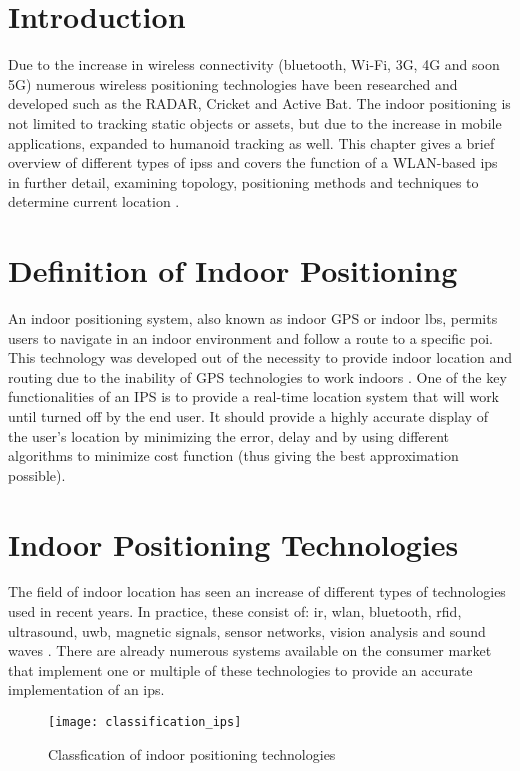 \section{Introduction}
Due to the increase in wireless connectivity (bluetooth, Wi-Fi, 3G, 4G and soon 5G) numerous wireless positioning technologies have been researched and developed such as the RADAR, Cricket and Active Bat. The indoor positioning is not limited to tracking static objects or assets, but due to the increase in mobile applications, expanded to humanoid tracking as well. This chapter gives a brief overview of different types of \acrfull{ips}s and covers the function of a WLAN-based \acrshort{ips} in further detail, examining topology, positioning methods and techniques to determine current location \cite{Sakpere2017}.
\section{Definition of Indoor Positioning}
An indoor positioning system, also known as indoor GPS or indoor \acrfull{lbs}, permits users to navigate in an indoor environment and follow a route to a specific \acrfull{poi}. This technology was developed out of the necessity to provide indoor location and routing due to the inability of GPS technologies to work indoors \cite{Indoors2019}. One of the key functionalities of an IPS is to provide a real-time location system that will work until turned off by the end user. It should provide a highly accurate display of the user's location by minimizing the error, delay and by using different algorithms to minimize cost function (thus giving the best approximation possible). 
\section{Indoor Positioning Technologies}
The field of indoor location has seen an increase of different types of technologies used in recent years. In practice, these consist of: \acrfull{ir}, \acrfull{wlan}, bluetooth, \acrfull{rfid}, ultrasound, \acrfull{uwb}, magnetic signals, sensor networks, vision analysis and sound waves \cite{Gu2009}. There are already numerous systems available on the consumer market that implement one or multiple of these technologies to provide an accurate implementation of an \acrshort{ips}.
\begin{figure}[h!]
\centering
\texttt{[image: classification\_ips]}
\caption{Classfication of indoor positioning technologies~\cite{ComparativeSurvey}}
\label{fig:ips_topologies}
\end{figure}
